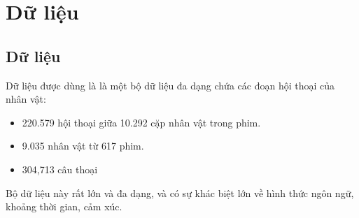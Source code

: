 %
\chapter{Dữ liệu}
\label{sec:data}

\section{Dữ liệu}
Dữ liệu được dùng là \textit{} là một bộ dữ liệu đa dạng chứa các đoạn hội thoại của nhân vật:
\begin{itemize}
    \item 220.579 hội thoại giữa 10.292 cặp nhân vật trong phim.
    \item 9.035 nhân vật từ 617 phim.
    \item 304,713 câu thoại
\end{itemize}
Bộ dữ liệu này rất lớn và đa dạng, và có sự khác biệt lớn về hình thức ngôn ngữ, khoảng thời gian, cảm xúc.

